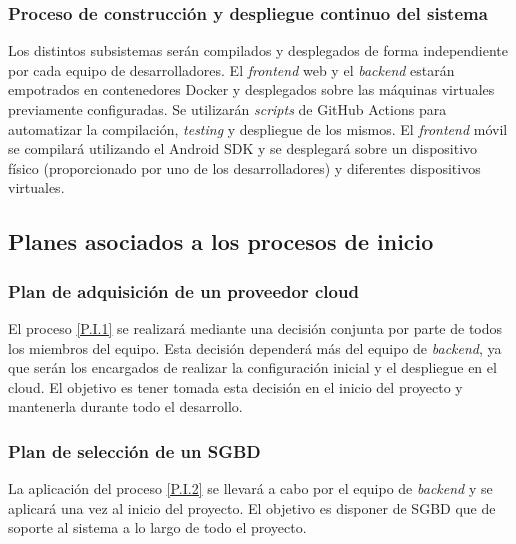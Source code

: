 \documentclass{article}
\begin{document}
\subsubsection{Proceso de construcción y despliegue continuo del sistema} \label{P.T.6}
Los distintos subsistemas serán compilados y desplegados de forma independiente por cada equipo de desarrolladores.
El \textit{frontend} web y el \textit{backend} estarán empotrados en contenedores Docker y desplegados sobre las máquinas virtuales previamente configuradas. Se utilizarán \textit{scripts} de GitHub Actions para automatizar la compilación, \textit{testing} y despliegue de los mismos. El \textit{frontend} móvil se compilará utilizando el Android SDK y se desplegará sobre un dispositivo físico (proporcionado por uno de los desarrolladores) y diferentes dispositivos virtuales.

\pagebreak


\subsection{Planes asociados a los procesos de inicio}

\subsubsection{Plan de adquisición de un proveedor cloud} \label{PL.I.1}

El proceso \ref{P.I.1} se realizará mediante una decisión conjunta por parte de todos los miembros del equipo. Esta decisión dependerá más del equipo de \textit{backend}, ya que serán los encargados de realizar la configuración inicial y el despliegue en el cloud. El objetivo es tener tomada esta decisión en el inicio del proyecto y mantenerla durante todo el desarrollo.
 
\subsubsection{Plan de selección de un SGBD}  \label{PL.I.2}

La aplicación del proceso \ref{P.I.2} se llevará a cabo por el equipo de \textit{backend} y se aplicará una vez al inicio del proyecto. El objetivo es disponer de SGBD que de soporte al sistema a lo largo de todo el proyecto.
\end{document}
